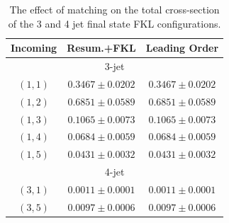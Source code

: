 	\begin{table}[hbt]
	\centering
	\caption{The effect of matching on the total cross-section of the 3 and 4 jet final state FKL
	configurations.}
	\label{tab:matching2}
	\begin{tabular}{c|c|c}
	Incoming & Resum.+FKL & Leading Order \\ \hline
	\multicolumn{3}{c}{3-jet} \\ \hline
	$(1, 1)$  & $0.3467 \pm 0.0202$ & $0.3467 \pm 0.0202$ \\
	$(1, 2)$  & $0.6851 \pm 0.0589$ & $0.6851 \pm 0.0589$ \\
	$(1, 3)$  & $0.1065 \pm 0.0073$ & $0.1065 \pm 0.0073$ \\
	$(1, 4)$  & $0.0684 \pm 0.0059$ & $0.0684 \pm 0.0059$ \\
	$(1, 5)$  & $0.0431 \pm 0.0032$ & $0.0431 \pm 0.0032$ \\ \hline
	\multicolumn{3}{c}{4-jet} \\ \hline
	$(3, 1)$  & $0.0011 \pm 0.0001$ & $0.0011 \pm 0.0001$ \\
	$(3, 5)$  & $0.0097 \pm 0.0006$ & $0.0097 \pm 0.0006$ \\ \hline
	\end{tabular}
	\end{table}

